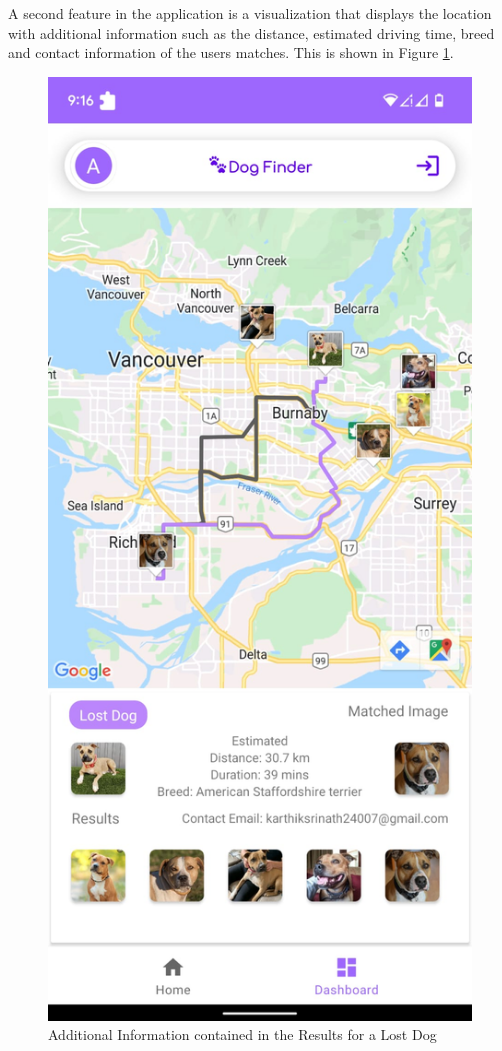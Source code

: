 \documentclass{article}
\begin{document}
\noindent A second feature in the application is a visualization that displays the location with additional information such as the distance, estimated driving time, breed and contact information of the users matches.  This is shown in Figure \ref{fig:x Android app 2}.

\begin{figure}[h]
\centering
	\includegraphics[scale=0.1]{final-report-images/app-locating-dogs.jpeg}
\caption{Additional Information contained in the Results for a Lost Dog}
\label{fig:x Android app 2}
\end{figure}
\end{document}
